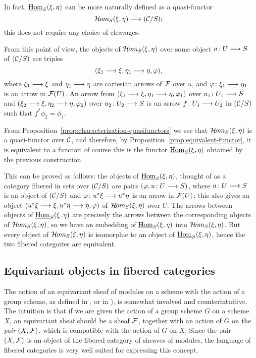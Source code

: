 \begin{3   FIBERED CATEGORIES}
\begin{3.7 The functors of arrows of a fibcat}
In fact, $\mathop{\underline{\mathrm{Hom}}}\nolimits_S(\xi, \eta)$ can be more naturally defined as a quasi-functor
   \[
   \curshom_S(\xi, \eta) \arr (\cC/S);
   \]
this does not require any choice of cleavages.

From this point of view, the objects of $\mathop{\mathcal{H}\hskip -.8pt om}\nolimits_S(\xi, \eta)$ over some object $u \colon U \arr S$ of $(\mathcal{C}/S)$ are triples
   \[
   (\xi_1 \arr \xi, \eta_1 \arr \eta, \phi),
   \]
where $\xi_1 \arr \xi$ and $\eta_1 \arr \eta$ are cartesian arrows of $\mathcal{F}$ over $u$, and $\phi \colon \xi_1 \arr \eta_1$ is an arrow in $\mathcal{F}(U)$. An arrow from $(\xi_1 \arr \xi, \eta_1 \arr \eta, \phi_1)$ over $u_1 \colon U_1 \arr S$ and $(\xi_2 \arr \xi, \eta_2 \arr \eta, \phi_2)$ over $u_2 \colon U_2 \arr S$ is an arrow $f \colon U_1 \arr U_2$ in $(\mathcal{C}/S)$ such that $f^*\phi_2 = \phi_1$.

From Proposition~\ref{prop:characterization-quasifunctors} we see that $\mathop{\mathcal{H}\hskip -.8pt om}\nolimits_S(\xi, \eta)$ is a quasi-functor over $\mathcal{C}$, and therefore, by Proposition~\ref{prop:equivalent-functor}, it is equivalent to a functor: of course this is the functor $\mathop{\underline{\mathrm{Hom}}}\nolimits_S(\xi, \eta)$ obtained by the previous construction.

This can be proved as follows: the objects of $\mathop{\underline{\mathrm{Hom}}}\nolimits_S(\xi, \eta)$, thought of as a category fibered in sets over $(\mathcal{C}/S)$ are pairs $(\phi, u \colon U \arr S)$, where $u \colon U \arr S$ is an object of $(\mathcal{C}/S)$ and $\phi \colon u^* \xi \arr u^* \eta$ is an arrow in $\mathcal{F}(U)$; this also gives an object $(u^* \xi \arr \xi, u^*\eta \arr \eta, \phi)$ of $\mathop{\mathcal{H}\hskip -.8pt om}\nolimits_S(\xi, \eta)$ over $U$. The arrows between objects of $\mathop{\underline{\mathrm{Hom}}}\nolimits_S(\xi, \eta)$ are precisely the arrows between the corresponding objects of $\mathop{\mathcal{H}\hskip -.8pt om}\nolimits_S(\xi, \eta)$, so we have an embedding of $\mathop{\underline{\mathrm{Hom}}}\nolimits_S(\xi, \eta)$ into $\mathop{\mathcal{H}\hskip -.8pt om}\nolimits_S(\xi, \eta)$. But every object of $\mathop{\mathcal{H}\hskip -.8pt om}\nolimits_S(\xi, \eta)$ is isomorphic to an object of $\mathop{\underline{\mathrm{Hom}}}\nolimits_S(\xi, \eta)$, hence the two fibered categories are equivalent.


\end{3.7 The functors of arrows of a fibcat}
\begin{3.8 Equivariant objects in fibcats}
\setcounter{section}{7}
\section{Equivariant objects in fibered categories}
\label{sec:fibered-actions}


The notion of an equivariant sheaf of modules on a scheme with the action of a group scheme, as defined in \cite[Chapter~1, \S~3]{git}, or in \cite{thomason87}), is somewhat involved and counterintuitive. The intuition is that if we are given the action of a group scheme $G$ on a scheme $X$, an equivariant sheaf should be a sheaf $\mathcal{F}$, together with an action of $G$ on the \emph{pair} $(X, \mathcal{F})$, which is compatible with the action of $G$ on $X$. Since the pair $(X, \mathcal{F})$ is an object of the fibered category of sheaves of modules, the language of fibered categories is very well suited for expressing this concept.


\end{3.8 Equivariant objects in fibcats}
\end{3   FIBERED CATEGORIES}

